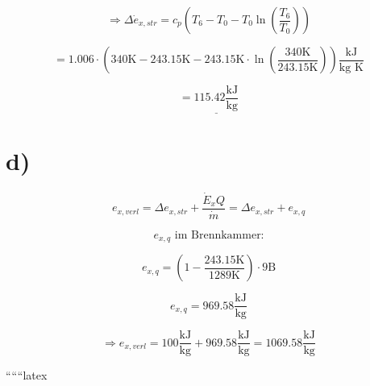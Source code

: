 \[
\Rightarrow \Delta \dot{e}_{x,str} = c_p \left( T_6 - T_0 - T_0 \ln \left( \frac{T_6}{T_0} \right) \right)
\]

\[
= 1.006 \cdot \left( 340 \text{K} - 243.15 \text{K} - 243.15 \text{K} \cdot \ln \left( \frac{340 \text{K}}{243.15 \text{K}} \right) \right) \frac{\text{kJ}}{\text{kg K}}
\]

\[
= \underline{115.42 \frac{\text{kJ}}{\text{kg}}}
\]

\section*{d)}

\[
e_{x,verl} = \Delta e_{x,str} + \frac{\dot{E}_x Q}{\dot{m}} = \Delta e_{x,str} + e_{x,q}
\]

\[
e_{x,q} \text{ im Brennkammer:}
\]

\[
e_{x,q} = \left( 1 - \frac{243.15 \text{K}}{1289 \text{K}} \right) \cdot 9 \text{B}
\]

\[
e_{x,q} = 969.58 \frac{\text{kJ}}{\text{kg}}
\]

\[
\Rightarrow e_{x,verl} = 100 \frac{\text{kJ}}{\text{kg}} + 969.58 \frac{\text{kJ}}{\text{kg}} = 1069.58 \frac{\text{kJ}}{\text{kg}}
\]

``````latex


